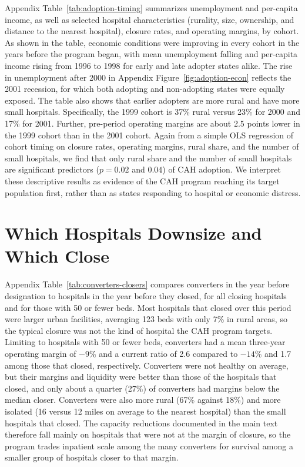 \documentclass[a4paper, 12pt]{article}
\begin{document}
Appendix Table~\ref{tab:adoption-timing} summarizes unemployment and per-capita income, as well as selected hospital characteristics (rurality, size, ownership, and distance to the nearest hospital), closure rates, and operating margins, by cohort. As shown in the table, economic conditions were improving in every cohort in the years before the program began, with mean unemployment falling and per-capita income rising from 1996 to 1998 for early and late adopter states alike. The rise in unemployment after 2000 in Appendix Figure~\ref{fig:adoption-econ} reflects the 2001 recession, for which both adopting and non-adopting states were equally exposed. The table also shows that earlier adopters are more rural and have more small hospitals. Specifically, the 1999 cohort is 37\% rural versus 23\% for 2000 and 17\% for 2001. Further, pre-period operating margins are about 2.5 points lower in the 1999 cohort than in the 2001 cohort. Again from a simple OLS regression of cohort timing on closure rates, operating margins, rural share, and the number of small hospitals, we find that only rural share and the number of small hospitals are significant predictors ($p = 0.02$ and $0.04$) of CAH adoption. We interpret these descriptive results as evidence of the CAH program reaching its target population first, rather than as states responding to hospital or economic distress.




\section{Which Hospitals Downsize and Which Close}
\label{sec:app-populations}

Appendix Table~\ref{tab:converters-closers} compares converters in the year before designation to hospitals in the year before they closed, for all closing hospitals and for those with 50 or fewer beds. Most hospitals that closed over this period were larger urban facilities, averaging 123 beds with only 7\% in rural areas, so the typical closure was not the kind of hospital the CAH program targets. Limiting to hospitals with 50 or fewer beds, converters had a mean three-year operating margin of $-9$\% and a current ratio of 2.6 compared to $-14$\% and 1.7 among those that closed, respectively. Converters were not healthy on average, but their margins and liquidity were better than those of the hospitals that closed, and only about a quarter (27\%) of converters had margins below the median closer. Converters were also more rural (67\% against 18\%) and more isolated (16 versus 12 miles on average to the nearest hospital) than the small hospitals that closed. The capacity reductions documented in the main text therefore fall mainly on hospitals that were not at the margin of closure, so the program trades inpatient scale among the many converters for survival among a smaller group of hospitals closer to that margin.
\end{document}
